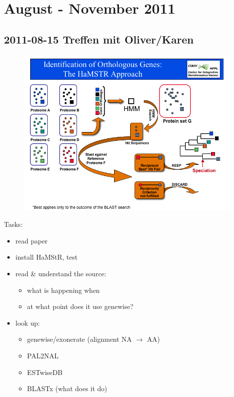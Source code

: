 \section{August - November 2011}
\subsection*{2011-08-15 Treffen mit Oliver/Karen}

\begin{figure}[h]
	\includegraphics[width=\textwidth]{img/hamstr-schema.png}
	\caption{\cite{Ebersberger2009}}
\end{figure}

Tasks:

\begin{itemize}
	\item read paper
	\item install HaMStR, test
	\item read \& understand the source:
		\begin{itemize}
			\item what is happening when
			\item at what point does it use genewise?
		\end{itemize}
	\item look up:
		\begin{itemize}
		\item genewise/exonerate (alignment NA $\rightarrow$ AA)
			\item PAL2NAL
			\item ESTwiseDB
			\item BLASTx (what does it do)
		\end{itemize}
\end{itemize}

